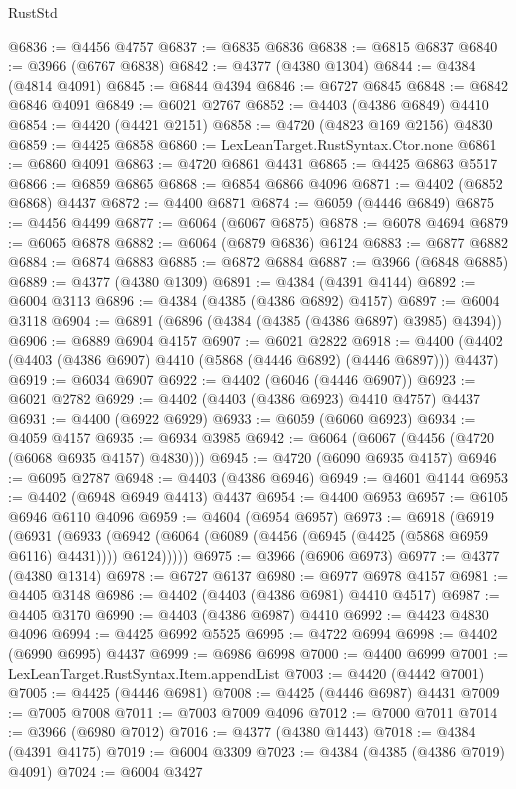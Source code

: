 \begin{lexlean}{RustStd}
\begin{coremodule}
@6836 := @4456 @4757
@6837 := @6835 @6836
@6838 := @6815 @6837
@6840 := @3966 (@6767 @6838)
@6842 := @4377 (@4380 @1304)
@6844 := @4384 (@4814 @4091)
@6845 := @6844 @4394
@6846 := @6727 @6845
@6848 := @6842 @6846 @4091
@6849 := @6021 @2767
@6852 := @4403 (@4386 @6849) @4410
@6854 := @4420 (@4421 @2151)
@6858 := @4720 (@4823 @169 @2156) @4830
@6859 := @4425 @6858
@6860 := LexLeanTarget.RustSyntax.Ctor.none
@6861 := @6860 @4091
@6863 := @4720 @6861 @4431
@6865 := @4425 @6863 @5517
@6866 := @6859 @6865
@6868 := @6854 @6866 @4096
@6871 := @4402 (@6852 @6868) @4437
@6872 := @4400 @6871
@6874 := @6059 (@4446 @6849)
@6875 := @4456 @4499
@6877 := @6064 (@6067 @6875)
@6878 := @6078 @4694
@6879 := @6065 @6878
@6882 := @6064 (@6879 @6836) @6124
@6883 := @6877 @6882
@6884 := @6874 @6883
@6885 := @6872 @6884
@6887 := @3966 (@6848 @6885)
@6889 := @4377 (@4380 @1309)
@6891 := @4384 (@4391 @4144)
@6892 := @6004 @3113
@6896 := @4384 (@4385 (@4386 @6892) @4157)
@6897 := @6004 @3118
@6904 := @6891 (@6896 (@4384 (@4385 (@4386 @6897) @3985) @4394))
@6906 := @6889 @6904 @4157
@6907 := @6021 @2822
@6918 := @4400 (@4402 (@4403 (@4386 @6907) @4410 (@5868 (@4446 @6892) (@4446 @6897))) @4437)
@6919 := @6034 @6907
@6922 := @4402 (@6046 (@4446 @6907))
@6923 := @6021 @2782
@6929 := @4402 (@4403 (@4386 @6923) @4410 @4757) @4437
@6931 := @4400 (@6922 @6929)
@6933 := @6059 (@6060 @6923)
@6934 := @4059 @4157
@6935 := @6934 @3985
@6942 := @6064 (@6067 (@4456 (@4720 (@6068 @6935 @4157) @4830)))
@6945 := @4720 (@6090 @6935 @4157)
@6946 := @6095 @2787
@6948 := @4403 (@4386 @6946)
@6949 := @4601 @4144
@6953 := @4402 (@6948 @6949 @4413) @4437
@6954 := @4400 @6953
@6957 := @6105 @6946 @6110 @4096
@6959 := @4604 (@6954 @6957)
@6973 := @6918
    (@6919
      (@6931
        (@6933 (@6942 (@6064 (@6089 (@4456 (@6945 (@4425 (@5868 @6959 @6116) @4431)))) @6124)))))
@6975 := @3966 (@6906 @6973)
@6977 := @4377 (@4380 @1314)
@6978 := @6727 @6137
@6980 := @6977 @6978 @4157
@6981 := @4405 @3148
@6986 := @4402 (@4403 (@4386 @6981) @4410 @4517)
@6987 := @4405 @3170
@6990 := @4403 (@4386 @6987) @4410
@6992 := @4423 @4830 @4096
@6994 := @4425 @6992 @5525
@6995 := @4722 @6994
@6998 := @4402 (@6990 @6995) @4437
@6999 := @6986 @6998
@7000 := @4400 @6999
@7001 := LexLeanTarget.RustSyntax.Item.appendList
@7003 := @4420 (@4442 @7001)
@7005 := @4425 (@4446 @6981)
@7008 := @4425 (@4446 @6987) @4431
@7009 := @7005 @7008
@7011 := @7003 @7009 @4096
@7012 := @7000 @7011
@7014 := @3966 (@6980 @7012)
@7016 := @4377 (@4380 @1443)
@7018 := @4384 (@4391 @4175)
@7019 := @6004 @3309
@7023 := @4384 (@4385 (@4386 @7019) @4091)
@7024 := @6004 @3427

\end{coremodule}
\end{lexlean}

